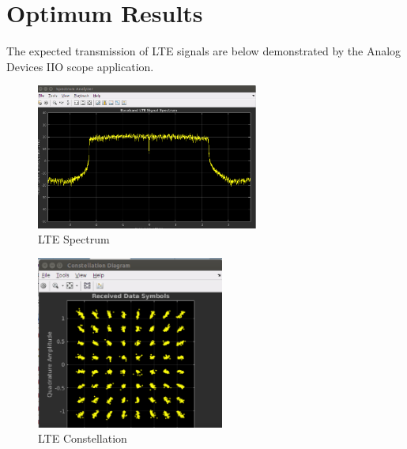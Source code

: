 \vfill
\clearpage

%
%

\section{Optimum Results}
\label{result:optimum}

The expected transmission of LTE signals are below demonstrated by the Analog
Devices IIO scope application.

\begin{figure}[htbp]
    \centering
    \includegraphics[width=0.65\textwidth]{./figures/lte_spectrum_iio}
    \caption{ LTE Spectrum
    \label{fig:ltespectrumiio}}
\end{figure}

\begin{figure}[htbp]
    \centering
    \includegraphics[width=0.55\textwidth]{./figures/lte_constellation_iio}
    \caption{ LTE Constellation
    \label{fig:lteconstellationiio}}
\end{figure}

